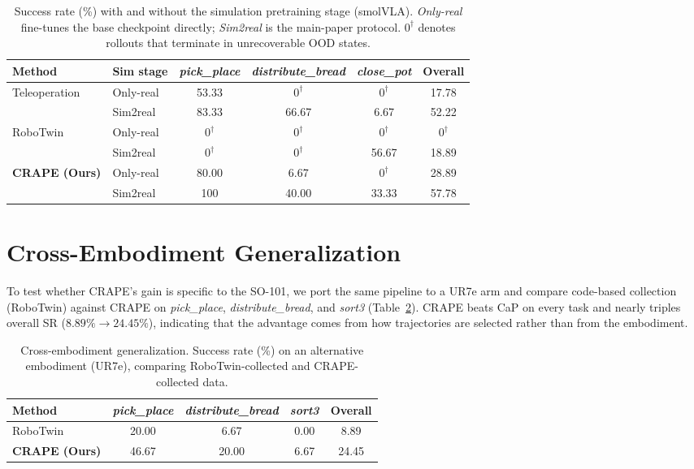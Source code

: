 \documentclass{article}
\begin{document}
\begin{table}[h]
\centering
\caption{Success rate (\%) with and without the simulation pretraining stage (smolVLA). \emph{Only-real} fine-tunes the base checkpoint directly; \emph{Sim2real} is the main-paper protocol. $0^{\dagger}$ denotes rollouts that terminate in unrecoverable OOD states.}
\label{tab:sim2real}
\small
\setlength{\tabcolsep}{6pt}
\begin{tabular}{llcccc}
\toprule
\textbf{Method} & \textbf{Sim stage} & \textit{pick\_place} & \textit{distribute\_bread} & \textit{close\_pot} & \textbf{Overall} \\
\midrule
\multirow{2}{*}{Teleoperation}
  & Only-real & 53.33 & $0^{\dagger}$ & $0^{\dagger}$ & 17.78 \\
  & Sim2real  & 83.33 & 66.67 & 6.67 & 52.22 \\
\midrule
\multirow{2}{*}{RoboTwin}
  & Only-real & $0^{\dagger}$ & $0^{\dagger}$ & $0^{\dagger}$ & $0^{\dagger}$ \\
  & Sim2real  & $0^{\dagger}$ & $0^{\dagger}$ & 56.67 & 18.89 \\
\midrule
\multirow{2}{*}{\textbf{CRAPE (Ours)}}
  & Only-real & 80.00 & 6.67 & $0^{\dagger}$ & 28.89 \\
  & Sim2real  & 100 & 40.00 & 33.33 & 57.78 \\
\bottomrule
\end{tabular}
\end{table}

\section{Cross-Embodiment Generalization}
\label{app:crossembod}

To test whether CRAPE's gain is specific to the SO-101, we port the same
pipeline to a UR7e arm and compare code-based collection (RoboTwin) against CRAPE
on \textit{pick\_place}, \textit{distribute\_bread}, and \textit{sort3}
(Table~\ref{tab:crossembod}). CRAPE beats CaP on every task and nearly triples
overall SR ($8.89\%\!\to\!24.45\%$), indicating that the advantage comes from how
trajectories are selected rather than from the embodiment.

\begin{table}[h]
\centering
\caption{Cross-embodiment generalization. Success rate (\%) on an alternative embodiment (UR7e), comparing RoboTwin-collected and CRAPE-collected data.}
\label{tab:crossembod}
\small
\setlength{\tabcolsep}{6pt}
\begin{tabular}{lcccc}
\toprule
\textbf{Method} & \textit{pick\_place} & \textit{distribute\_bread} & \textit{sort3} & \textbf{Overall} \\
\midrule
RoboTwin & 20.00 & 6.67 & 0.00 & 8.89 \\
\textbf{CRAPE (Ours)} & 46.67 & 20.00 & 6.67 & 24.45 \\
\bottomrule
\end{tabular}
\end{table}
\end{document}
